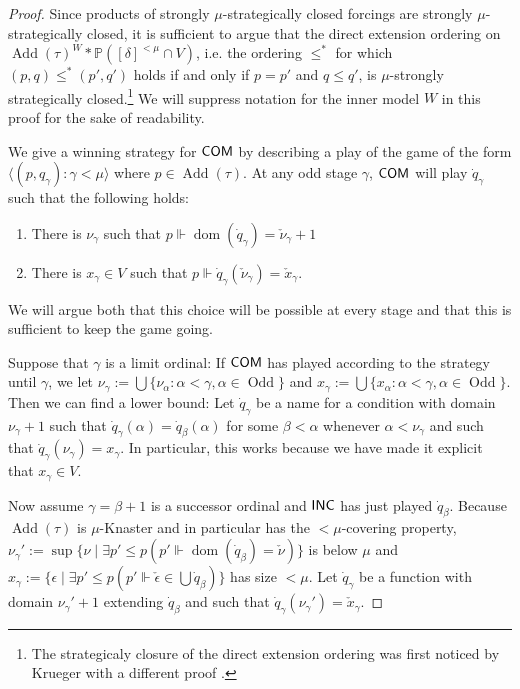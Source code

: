 \documentclass[a4paper]{amsart}
\theoremstyle{definition}
\theoremstyle{remark}
\theoremstyle{plain}
\numberwithin{mydef}{section}
\DeclareMathOperator{\dom}{dom}
\DeclareMathOperator{\Add}{Add}
\DeclareMathOperator{\Odd}{Odd}
\newcommand{\dP}{\mathbb{P}}
\newcommand{\seq}[2]{\langle #1 : #2 \rangle}
\newcommand{\COM}{\textsf{\textup{COM}}}
\newcommand{\INC}{\textsf{\textup{INC}}}
\begin{document}
	\begin{proof} Since products of strongly $\mu$-strategically closed forcings are strongly $\mu$-strategically closed, it is sufficient to argue that the direct extension ordering on $\Add(\tau)^W *\dP([\delta]^{<\mu}\cap V)$, i.e$.$ the ordering $\le^*$ for which $(p,q) \le^* (p',q')$ holds if and only if $p = p'$ and $q \le q'$, is $\mu$-strongly strategically closed.\footnote{The strategicaly closure of the direct extension ordering was first noticed by Krueger with a different proof \cite{Krueger2008b}.} We will suppress notation for the inner model $W$ in this proof for the sake of readability.
	
	
	
		We give a winning strategy for $\COM$ by describing a play of the game of the form $\seq{(p,q_\gamma)}{\gamma<\mu}$ where $p\in\Add(\tau)$. At any odd stage $\gamma$, $\COM$ will play $\dot{q}_{\gamma}$ such that the following holds:
		\begin{enumerate}
			\item There is $\nu_{\gamma}$ such that $p\Vdash\dom(\dot{q}_{\gamma})=\check{\nu}_{\gamma}+1$
			\item There is $x_{\gamma} \in V$ such that $p\Vdash\dot{q}_{\gamma}(\check{\nu}_{\gamma})=\check{x}_{\gamma}$.
		\end{enumerate}
We will argue both that this choice will be possible at every stage and that this is sufficient to keep the game going.
		
		Suppose that $\gamma$ is a limit ordinal: If $\COM$ has played according to the strategy until $\gamma$, we let $\nu_{\gamma}:=\bigcup\{ \nu_{\alpha}:\alpha<\gamma,\alpha \in \Odd\}$ and $x_{\gamma}:=\bigcup \{x_{\alpha}:\alpha<\gamma,\alpha \in \Odd\}$. Then we can find a lower bound: Let $\dot{q}_{\gamma}$ be a name for a condition with domain $\nu_\gamma+1$ such that $\dot{q}_{\gamma}(\alpha)=\dot{q}_{\beta}(\alpha)$ for some $\beta<\alpha$ whenever $\alpha<\nu_{\gamma}$ and such that $\dot{q}_{\gamma}(\nu_{\gamma})=x_{\gamma}$. In particular, this works because we have made it explicit that $x_\gamma \in V$.
		
		Now assume $\gamma=\beta+1$ is a successor ordinal and $\INC$ has just played $\dot{q}_{\beta}$. Because $\Add(\tau)$ is $\mu$-Knaster and in particular has the $<\mu$-covering property, $\nu_{\gamma}':=\sup\{\nu\;|\;\exists p'\leq p(p'\Vdash\dom(\dot{q}_{\beta})=\check{\nu})\}$ is below $\mu$ and $x_{\gamma}:=\{\epsilon\;|\;\exists p'\leq p(p'\Vdash\check{\epsilon}\in\bigcup\dot{q}_{\beta})\}$ has size $<\mu$. Let $\dot{q}_{\gamma}$ be a function with domain $\nu_{\gamma}'+1$ extending $\dot{q}_\beta$ and such that $\dot{q}_{\gamma}(\nu_{\gamma}')=\check{x}_{\gamma}$.
		

\end{proof}
\end{document}
